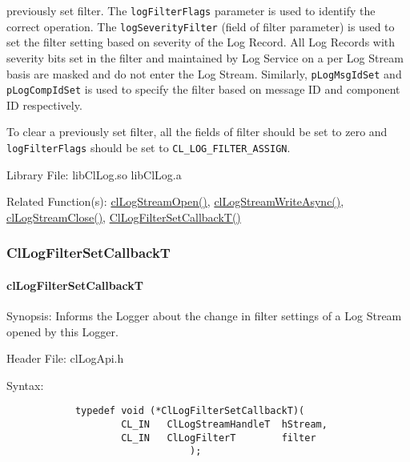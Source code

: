 \begin{flushleft}
\begin{Desc}
previously set filter. The {\tt{logFilterFlags}} parameter is used to identify the correct operation. The {\tt{logSeverityFilter}} (field of filter parameter) 
is used to set the filter setting based on severity of the Log Record. All Log Records with severity bits set in the filter and maintained by Log Service 
on a per Log Stream basis are masked and do not enter the Log Stream. Similarly, {\tt{pLogMsgIdSet}} and {\tt{pLogCompIdSet}} is used to specify the filter
based on message ID and component ID respectively.
\par
To clear a previously set filter, all the fields of filter should be set to zero and {\tt{logFilterFlags}} should be set to 
{\tt{CL\_\-LOG\_\-FILTER\_\-ASSIGN}}.
\end{Desc}
\begin{Desc}
\item[Library File:] libClLog.so
\newline
libClLog.a
\end{Desc}
\begin{Desc}
\item[Related Function(s):]\hyperlink{pagelog106}{clLogStreamOpen()}, \hyperlink{pagelog109}{clLogStreamWriteAsync()},
\hyperlink{pagelog108}{clLogStreamClose()}, \hyperlink{pagelog111}{ClLogFilterSetCallbackT()}\end{Desc}
\newpage



\subsubsection{ClLogFilterSetCallbackT}
\hypertarget{pagelog111}{}\paragraph{cl\-Log\-Filter\-Set\-CallbackT}\label{pagelog111}
\begin{Desc}
\item[Synopsis:] Informs the Logger about the change in filter settings of a Log Stream opened by this Logger.\end{Desc}
\begin{Desc}
\item[Header File:] clLogApi.h \end{Desc}
\begin{Desc}
\item[Syntax:]
\footnotesize\begin{verbatim}        	
			typedef void (*ClLogFilterSetCallbackT)(
					CL_IN	ClLogStreamHandleT	hStream,
					CL_IN	ClLogFilterT		filter
								);


\end{verbatim}
\end{Desc}
\end{flushleft}
